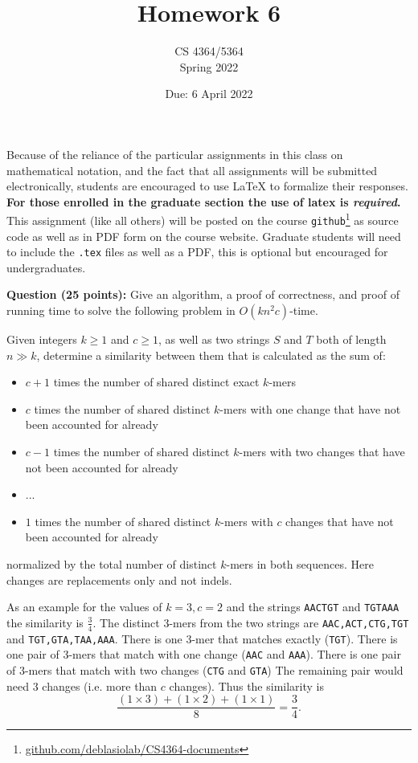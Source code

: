 \documentclass[11pt, oneside]{article}   	%
\title{Homework 6}
\author{CS 4364/5364\\Spring 2022}
\date{Due: 6 April 2022}							%
\begin{document}
\maketitle

Because of the reliance of the particular assignments in this class on mathematical notation, 
and the fact that all assignments will be submitted electronically, 
students are encouraged to use \LaTeX{} to formalize their responses. 
\textbf{For those enrolled in the graduate section the use of latex is \emph{required}.}
This assignment (like all others) will be posted on the course \texttt{github}\footnote{\url{github.com/deblasiolab/CS4364-documents}} as source code as well as in PDF form on the course website. 
Graduate students will need to include the \texttt{.tex} files as well as a PDF, this is optional but encouraged for undergraduates. 

\textbf{Question (25 points):} 
Give an algorithm, a proof of correctness, and proof of running time to solve the following problem in $O(kn^2c)$-time.

Given integers $k\ge1$ and $c\ge1$, as well as two strings $S$ and $T$ both of length $n \gg k$, determine a similarity between them that is calculated as the sum of: 
\begin{itemize}
\item $c+1$ times the number of shared distinct exact $k$-mers
\item $c$ times the number of shared distinct $k$-mers with one change that have not been accounted for already
\item $c-1$ times the number of shared distinct $k$-mers with two changes that have not been accounted for already
\item ...
\item $1$ times the number of shared distinct $k$-mers with $c$ changes that have not been accounted for already
\end{itemize}
normalized by the total number of distinct $k$-mers in both sequences.
Here changes are replacements only and not indels. 

As an example for the values of $k=3, c=2$ and the strings \texttt{AACTGT} and \texttt{TGTAAA} the similarity is $\frac{3}{4}$. 
The distinct $3$-mers from the two strings are \texttt{AAC,ACT,CTG,TGT} and \texttt{TGT,GTA,TAA,AAA}.
There is one $3$-mer that matches exactly (\texttt{TGT}).
There is one pair of $3$-mers that match with one change (\texttt{AAC} and \texttt{AAA}).
There is one pair of $3$-mers that match with two changes (\texttt{CTG} and \texttt{GTA})
The remaining pair would need 3 changes (i.e. more than $c$ changes). 
Thus the similarity is 
\[
\frac{(1\times 3) + (1 \times 2) + (1 \times 1)}{8} = \frac{3}{4}.
\]
\end{document}
